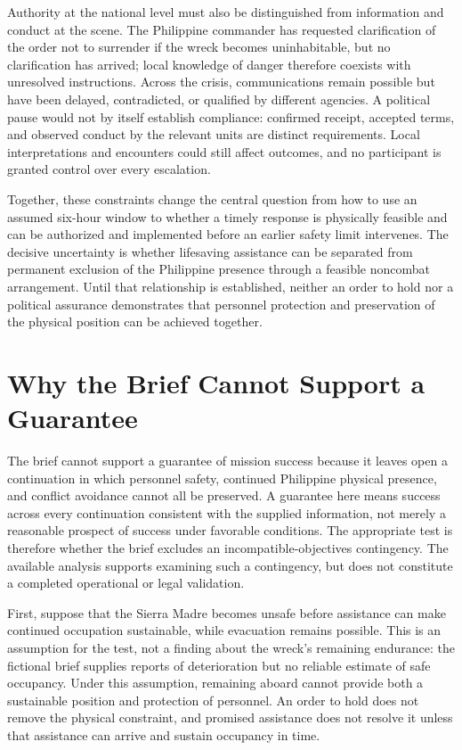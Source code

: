 \documentclass[11pt]{article}
\begin{document}
Authority at the national level must also be distinguished from information and conduct at the scene. The Philippine commander has requested clarification of the order not to surrender if the wreck becomes uninhabitable, but no clarification has arrived; local knowledge of danger therefore coexists with unresolved instructions. Across the crisis, communications remain possible but have been delayed, contradicted, or qualified by different agencies. A political pause would not by itself establish compliance: confirmed receipt, accepted terms, and observed conduct by the relevant units are distinct requirements. Local interpretations and encounters could still affect outcomes, and no participant is granted control over every escalation.

Together, these constraints change the central question from how to use an assumed six-hour window to whether a timely response is physically feasible and can be authorized and implemented before an earlier safety limit intervenes. The decisive uncertainty is whether lifesaving assistance can be separated from permanent exclusion of the Philippine presence through a feasible noncombat arrangement. Until that relationship is established, neither an order to hold nor a political assurance demonstrates that personnel protection and preservation of the physical position can be achieved together.

\section{Why the Brief Cannot Support a Guarantee}
The brief cannot support a guarantee of mission success because it leaves open a continuation in which personnel safety, continued Philippine physical presence, and conflict avoidance cannot all be preserved. A guarantee here means success across every continuation consistent with the supplied information, not merely a reasonable prospect of success under favorable conditions. The appropriate test is therefore whether the brief excludes an incompatible-objectives contingency. The available analysis supports examining such a contingency, but does not constitute a completed operational or legal validation.

First, suppose that the Sierra Madre becomes unsafe before assistance can make continued occupation sustainable, while evacuation remains possible. This is an assumption for the test, not a finding about the wreck\textquoteright{}s remaining endurance: the fictional brief supplies reports of deterioration but no reliable estimate of safe occupancy. Under this assumption, remaining aboard cannot provide both a sustainable position and protection of personnel. An order to hold does not remove the physical constraint, and promised assistance does not resolve it unless that assistance can arrive and sustain occupancy in time.
\end{document}
